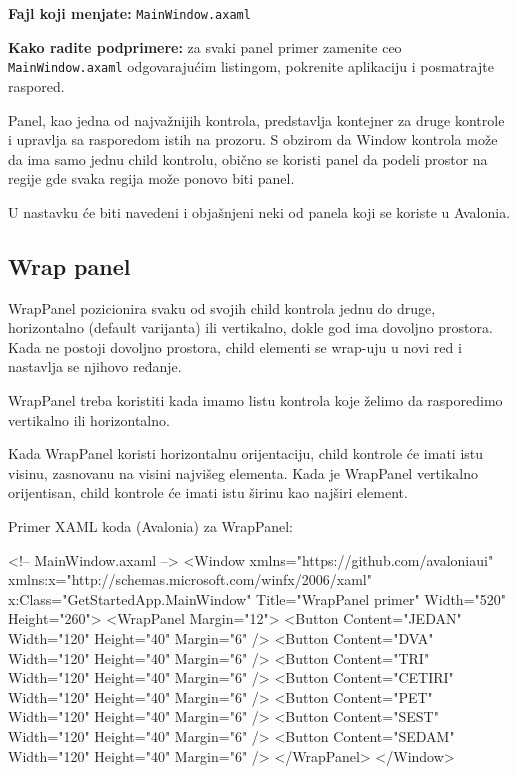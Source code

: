 \documentclass[11pt,a4paper]{article}
\begin{document}
\textbf{Fajl koji menjate:} \texttt{MainWindow.axaml}

\textbf{Kako radite podprimere:} za svaki panel primer zamenite ceo \texttt{MainWindow.axaml} odgovarajućim listingom, pokrenite aplikaciju i posmatrajte raspored.

Panel, kao jedna od najvažnijih kontrola, predstavlja kontejner za druge kontrole i upravlja sa rasporedom istih na prozoru. S obzirom da Window kontrola može da ima samo jednu child kontrolu, obično se koristi panel da podeli prostor na regije gde svaka regija može ponovo biti panel.

U nastavku će biti navedeni i objašnjeni neki od panela koji se koriste u Avalonia.

\subsection{Wrap panel}
WrapPanel pozicionira svaku od svojih child kontrola jednu do druge, horizontalno (default varijanta) ili vertikalno, dokle god ima dovoljno prostora. Kada ne postoji dovoljno prostora, child elementi se wrap-uju u novi red i nastavlja se njihovo ređanje.

WrapPanel treba koristiti kada imamo listu kontrola koje želimo da rasporedimo vertikalno ili horizontalno.

Kada WrapPanel koristi horizontalnu orijentaciju, child kontrole će imati istu visinu, zasnovanu na visini najvišeg elementa. Kada je WrapPanel vertikalno orijentisan, child kontrole će imati istu širinu kao najširi element.

Primer XAML koda (Avalonia) za WrapPanel:

\begin{CodeBlock}
<!-- MainWindow.axaml -->
<Window xmlns="https://github.com/avaloniaui"
        xmlns:x="http://schemas.microsoft.com/winfx/2006/xaml"
        x:Class="GetStartedApp.MainWindow"
        Title="WrapPanel primer" Width="520" Height="260">
  <WrapPanel Margin="12">
    <Button Content="JEDAN" Width="120" Height="40" Margin="6" />
    <Button Content="DVA" Width="120" Height="40" Margin="6" />
    <Button Content="TRI" Width="120" Height="40" Margin="6" />
    <Button Content="CETIRI" Width="120" Height="40" Margin="6" />
    <Button Content="PET" Width="120" Height="40" Margin="6" />
    <Button Content="SEST" Width="120" Height="40" Margin="6" />
    <Button Content="SEDAM" Width="120" Height="40" Margin="6" />
  </WrapPanel>
</Window>
\end{CodeBlock}
\end{document}

